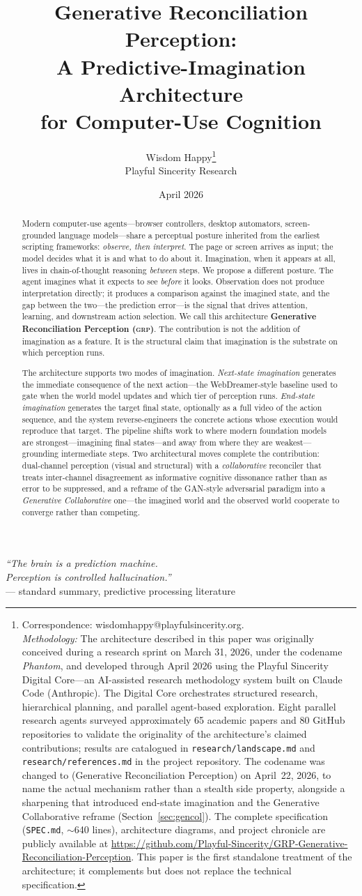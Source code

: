 \documentclass[12pt]{article}
\title{Generative Reconciliation Perception: \\
A Predictive-Imagination Architecture \\
for Computer-Use Cognition}
\author{Wisdom Happy\thanks{Correspondence: wisdomhappy@playfulsincerity.org. \\[0.5em]
\textit{Methodology:} The architecture described in this paper was originally
conceived during a research sprint on March 31, 2026, under the codename
\emph{Phantom}, and developed through April 2026 using the Playful
Sincerity Digital Core---an AI-assisted research methodology system built on
Claude Code (Anthropic). The Digital Core orchestrates structured research,
hierarchical planning, and parallel agent-based exploration. Eight parallel
research agents surveyed approximately 65 academic papers and 80 GitHub
repositories to validate the originality of the architecture's claimed
contributions; results are catalogued in
\texttt{research/landscape.md} and \texttt{research/references.md} in the
project repository. The codename was changed to \grp{} (Generative Reconciliation Perception) on April~22, 2026, to name the actual mechanism rather than a stealth side property,
alongside a sharpening that introduced end-state imagination and the
Generative Collaborative reframe (Section~\ref{sec:gencol}). The complete
specification (\texttt{SPEC.md}, $\sim$640 lines), architecture diagrams,
and project chronicle are publicly available at
\url{https://github.com/Playful-Sincerity/GRP-Generative-Reconciliation-Perception}.
This paper is the first standalone treatment of the architecture; it
complements but does not replace the technical specification.} \\[0.3em]
Playful Sincerity Research}
\date{April 2026}
\theoremstyle{definition}
\theoremstyle{remark}
\newcommand{\grp}{\textsc{grp}}
\begin{document}
\maketitle

\begin{center}
\textit{``The brain is a prediction machine. \\
Perception is controlled hallucination.''}\\[0.3em]
--- standard summary, predictive processing literature
\end{center}
\vspace{1em}

\begin{abstract}
Modern computer-use agents---browser controllers, desktop automators,
screen-grounded language models---share a perceptual posture inherited
from the earliest scripting frameworks: \emph{observe, then interpret}.
The page or screen arrives as input; the model decides what it is and
what to do about it. Imagination, when it appears at all, lives in
chain-of-thought reasoning \emph{between} steps. We propose a different
posture. The agent imagines what it expects to see \emph{before} it
looks. Observation does not produce interpretation directly; it produces
a comparison against the imagined state, and the gap between the
two---the prediction error---is the signal that drives attention,
learning, and downstream action selection. We call this architecture
\textbf{Generative Reconciliation Perception (\grp{})}. The contribution
is not the addition of imagination as a feature. It is the structural
claim that imagination is the substrate on which perception runs.

The architecture supports two modes of imagination. \emph{Next-state
imagination} generates the immediate consequence of the next
action---the WebDreamer-style baseline used to gate when the world
model updates and which tier of perception runs. \emph{End-state
imagination} generates the target final state, optionally as a full
video of the action sequence, and the system reverse-engineers the
concrete actions whose execution would reproduce that target. The
pipeline shifts work to where modern foundation models are
strongest---imagining final states---and away from where they are
weakest---grounding intermediate steps. Two architectural moves complete
the contribution: dual-channel perception (visual and structural) with
a \emph{collaborative} reconciler that treats inter-channel disagreement
as informative cognitive dissonance rather than as error to be
suppressed, and a reframe of the GAN-style adversarial paradigm into a
\emph{Generative Collaborative} one---the imagined world and the
observed world cooperate to converge rather than competing.


\end{abstract}
\end{document}
